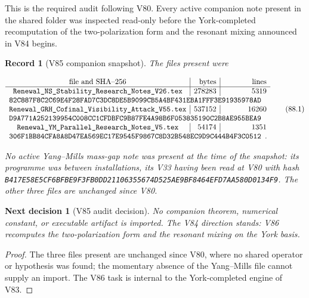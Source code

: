 \documentclass[11pt]{article}
\newtheorem{decision}[theorem]{Next decision}
\newtheorem{record}[theorem]{Record}
\theoremstyle{remark}
\begin{document}
This is the required audit following V80.  Every active companion note
present in the shared folder was inspected read-only before the
York-completed recomputation of the two-polarization form and the
resonant mixing announced in V84 begins.

\begin{record}[V85 companion snapshot]
\label{rec:v19v85-snapshot}
The files present were

\[
\begin{array}{c|r|r}
\hbox{file and SHA--256}&\hbox{bytes}&\hbox{lines}\\ \hline
\texttt{Renewal\_NS\_Stability\_Research\_Notes\_V26.tex}
&278283&5319\\
\multicolumn{3}{l}{
\texttt{82C887F8C2C69E4F28FAD7C3DC8DE5B9099CB5A4BF431EBA1FFF3E91935978AD}}
\\
\texttt{Renewal\_GRH\_Cofinal\_Visibility\_Attack\_V55.tex}
&537152&16260\\
\multicolumn{3}{l}{
\texttt{D9A771A252139954C008CC1CFDBFC9B87FE4A98B6F053835190C2B8AE955BEA9}}
\\
\texttt{Renewal\_YM\_Parallel\_Research\_Notes\_V5.tex}
&54174&1351\\
\multicolumn{3}{l}{
\texttt{306F1BB84CFA8A8D47EA569EC17E9545F9867C8D32B548EC9D9C444B4F3C0512}}.
\end{array}                                                     \tag{88.1}
\]

No active Yang--Mills mass-gap note was present at the time of the
snapshot: its programme was between installations, its V33 having
been read at V80 with hash
\texttt{B417E58E5CF6BFBE9F3FB0DD21106355674D525AE9BF8464EFD7AA580D0134F9}.
The other three files are unchanged since V80.
\end{record}

\begin{decision}[V85 audit decision]
\label{dec:v19v85-audit}
No companion theorem, numerical constant, or executable artifact is
imported.  The V84 direction stands: V86 recomputes the
two-polarization form and the resonant mixing on the York basis.
\end{decision}

\begin{proof}
The three files present are unchanged since V80, where no shared
operator or hypothesis was found; the momentary absence of the
Yang--Mills file cannot supply an import.  The V86 task is internal
to the York-completed engine of V83.
\end{proof}
\end{document}
